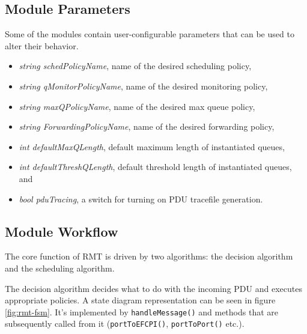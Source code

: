        \subsection{Module Parameters}
            Some of the modules contain user-configurable parameters that can be used to alter their behavior.
            \begin{itemize}
                \item \emph{string schedPolicyName}, name of the desired scheduling policy,
                \item \emph{string qMonitorPolicyName}, name of the desired monitoring policy,
                \item \emph{string maxQPolicyName}, name of the desired max queue policy,
                \item \emph{string ForwardingPolicyName}, name of the desired forwarding policy,
                \item \emph{int defaultMaxQLength}, default maximum length of instantiated queues,
                \item \emph{int defaultThreshQLength}, default threshold length of instantiated queues, and
                \item \emph{bool pduTracing}, a switch for turning on PDU tracefile generation.
            \end{itemize}

        \subsection{Module Workflow}

            The core function of RMT is driven by two algorithms: the decision algorithm and the scheduling algorithm.

            The decision algorithm decides what to do with the incoming PDU and executes appropriate policies. A state diagram representation can be seen in figure \ref{fig:rmt-fsm}. It's implemented by \texttt{handleMessage()} and methods that are subsequently called from it (\texttt{portToEFCPI()}, \texttt{portToPort()} etc.).

